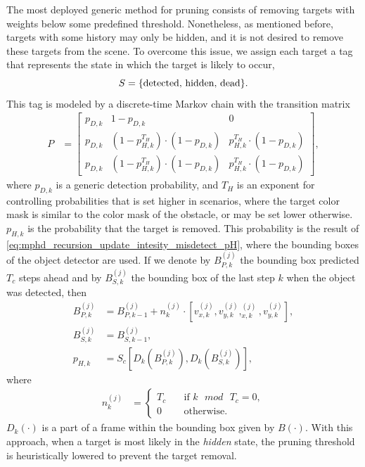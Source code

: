 The most deployed generic method for pruning consists of removing targets with weights below some predefined threshold. Nonetheless, as mentioned before, targets with some history may only be hidden, and it is not desired to remove these targets from the scene. To overcome this issue, we assign each target a tag that represents the state in which the target is likely to occur,
\begin{equation}
  S = \{\text{detected, hidden, dead}\}.
  \notag
\end{equation}
This tag is modeled by a discrete-time Markov chain with the transition matrix
\begin{align}
  \label{eq:mphd_transition_matrix}
  P &= \begin{bmatrix}
         p_{D,k} & 1-p_{D,k} & 0 \\
         p_{D,k} & (1-p_{H,k}^{T_H}) \cdot (1-p_{D,k}) & p_{H,k}^{T_H} \cdot (1- p_{D,k}) \\
         p_{D,k} & (1-p_{H,k}^{T_H}) \cdot (1-p_{D,k}) & p_{H,k}^{T_H} \cdot (1- p_{D,k})
  \end{bmatrix},
\end{align}
where $p_{D,k}$ is a generic detection probability, and $T_H$ is an exponent for controlling probabilities that is
set higher in scenarios, where the target color mask is similar to the color mask of the obstacle, or may be set
lower otherwise. $p_{H,k}$ is the probability that the target is removed. This probability is the result of \eqref{eq:mphd_recursion_update_intesity_misdetect_pH}, where the bounding boxes of the object detector are used.
If we denote by $B_{P,k}^{(j)}$ the bounding box predicted $T_c$ steps ahead and by $B_{S,k}^{(j)}$ the bounding box of the last step $k$ when the object was detected, then
\begin{align}
  B_{P,k}^{(j)} &= B_{P,k-1}^{(j)} + n_k^{(j)}\cdot [v_{x,{k}}^{(j)}, v_{y,{k}}^{(j)}, _{x,{k}}^{(j)}, v_{y,{k}}^{(j)}], \\
  B_{S,k}^{(j)} &= B_{S,k-1}^{(j)}, \\
  p_{H,k} &= S_c\left[D_k(B_{P,k}^{(j)}), D_k(B_{S,k}^{(j)})\right], \label{eq:mphd_recursion_update_intesity_misdetect_pH}
\end{align}
where
\begin{align}
  \label{eq:mphd_recursion_update_intesity_misdetect_T_move}
  n_k^{(j)} &=
  \begin{cases}
    T_c \quad & \text{if } k\text{ } mod \text{ }T_c = 0,  \\
    0 \quad & \text{otherwise.}
  \end{cases}
\end{align}
$D_k(\cdot)$ is a part of a frame within the bounding box given by $B(\cdot)$. With this approach, when a target is most likely in the \textit{hidden} state, the pruning threshold is heuristically lowered to prevent the target removal.

